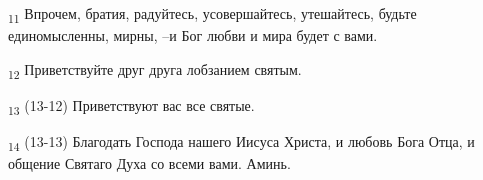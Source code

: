 \begin{tcolorbox}
\textsubscript{11} Впрочем, братия, радуйтесь, усовершайтесь, утешайтесь, будьте единомысленны, мирны, --и Бог любви и мира будет с вами.
\end{tcolorbox}
\begin{tcolorbox}
\textsubscript{12} Приветствуйте друг друга лобзанием святым.
\end{tcolorbox}
\begin{tcolorbox}
\textsubscript{13} (13-12) Приветствуют вас все святые.
\end{tcolorbox}
\begin{tcolorbox}
\textsubscript{14} (13-13) Благодать Господа нашего Иисуса Христа, и любовь Бога Отца, и общение Святаго Духа со всеми вами. Аминь.
\end{tcolorbox}
